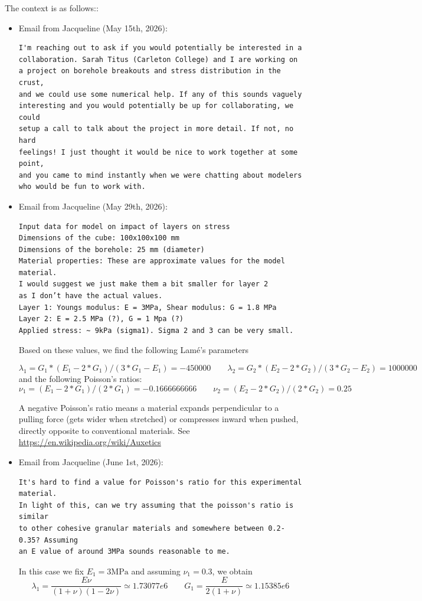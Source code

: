 The context is as follows::
\begin{itemize}
\item Email from Jacqueline (May 15th, 2026):
\begin{verbatim}
I'm reaching out to ask if you would potentially be interested in a 
collaboration. Sarah Titus (Carleton College) and I are working on 
a project on borehole breakouts and stress distribution in the crust, 
and we could use some numerical help. If any of this sounds vaguely 
interesting and you would potentially be up for collaborating, we could 
setup a call to talk about the project in more detail. If not, no hard 
feelings! I just thought it would be nice to work together at some point, 
and you came to mind instantly when we were chatting about modelers 
who would be fun to work with.
\end{verbatim} 

\item Email from Jacqueline (May 29th, 2026):
\begin{verbatim}
Input data for model on impact of layers on stress 
Dimensions of the cube: 100x100x100 mm
Dimensions of the borehole: 25 mm (diameter)
Material properties: These are approximate values for the model material. 
I would suggest we just make them a bit smaller for layer 2 
as I don’t have the actual values.
Layer 1: Youngs modulus: E = 3MPa, Shear modulus: G = 1.8 MPa
Layer 2: E = 2.5 MPa (?), G = 1 Mpa (?)
Applied stress: ~ 9kPa (sigma1). Sigma 2 and 3 can be very small.
\end{verbatim} 

Based on these values, we find the following Lam\'e's parameters

\[
\lambda_1=G_1*(E_1-2*G_1)/(3*G_1-E_1) = -450000
\qquad
\lambda_2=G_2*(E_2-2*G_2)/(3*G_2-E_2) = 1000000
\]
and the following Poisson's ratios:
\[
\nu_1=(E_1-2*G_1)/(2*G_1)= -0.1666666666
\qquad
\nu_2=(E_2-2*G_2)/(2*G_2)= 0.25
\]

A negative Poisson's ratio means a material expands perpendicular to 
a pulling force (gets wider when stretched) or compresses inward when pushed, 
directly opposite to conventional materials.
See \url{https://en.wikipedia.org/wiki/Auxetics}


\item Email from Jacqueline (June 1st, 2026):

\begin{verbatim} 
It's hard to find a value for Poisson's ratio for this experimental material. 
In light of this, can we try assuming that the poisson's ratio is similar 
to other cohesive granular materials and somewhere between 0.2-0.35? Assuming 
an E value of around 3MPa sounds reasonable to me.
\end{verbatim} 

In this case we fix $E_1=3\si{\mega\pascal}$ and assuming $\nu_1=0.3$, we obtain
\[
\lambda_1 = \frac{E \nu}{(1+\nu)(1-2\nu)} \simeq 1.73077e6
\qquad
G_1=\frac{E}{2(1+\nu)} \simeq 1.15385e6
\]

\end{itemize}



